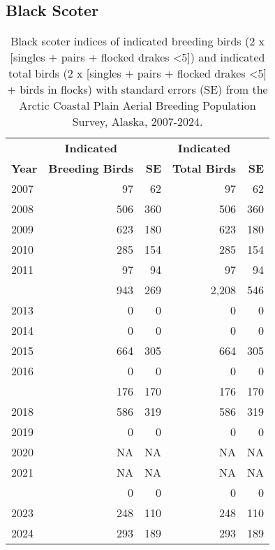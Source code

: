 \documentclass[
]{article}
\begin{document}
\subsection*{Black Scoter}\label{black-scoter-1}

\begingroup\fontsize{10}{12}\selectfont

\begin{longtable}[t]{lrrrr}

\caption{\label{tbl-BLSC}Black scoter indices of indicated breeding
birds (2 x {[}singles + pairs + flocked drakes \textless5{]}) and
indicated total birds (2 x {[}singles + pairs + flocked drakes
\textless5{]} + birds in flocks) with standard errors (SE) from the
Arctic Coastal Plain Aerial Breeding Population Survey, Alaska,
2007-2024.}

\tabularnewline

\\
\toprule
\multicolumn{1}{c}{\textbf{ }} & \multicolumn{1}{c}{\textbf{Indicated}} & \multicolumn{1}{c}{\textbf{ }} & \multicolumn{1}{c}{\textbf{Indicated}} & \multicolumn{1}{c}{\textbf{ }} \\
\cmidrule(l{3pt}r{3pt}){2-2} \cmidrule(l{3pt}r{3pt}){4-4}
\textbf{Year} & \textbf{Breeding Birds} & \textbf{SE} & \textbf{Total Birds} & \textbf{SE}\\
\midrule
2007 & 97 & 62 & 97 & 62\\
2008 & 506 & 360 & 506 & 360\\
2009 & 623 & 180 & 623 & 180\\
2010 & 285 & 154 & 285 & 154\\
2011 & 97 & 94 & 97 & 94\\
\addlinespace
2012 & 943 & 269 & 2,208 & 546\\
2013 & 0 & 0 & 0 & 0\\
2014 & 0 & 0 & 0 & 0\\
2015 & 664 & 305 & 664 & 305\\
2016 & 0 & 0 & 0 & 0\\
\addlinespace
2017 & 176 & 170 & 176 & 170\\
2018 & 586 & 319 & 586 & 319\\
2019 & 0 & 0 & 0 & 0\\
2020 & NA & NA & NA & NA\\
2021 & NA & NA & NA & NA\\
\addlinespace
2022 & 0 & 0 & 0 & 0\\
2023 & 248 & 110 & 248 & 110\\
2024 & 293 & 189 & 293 & 189\\
\bottomrule

\end{longtable}
\end{document}
